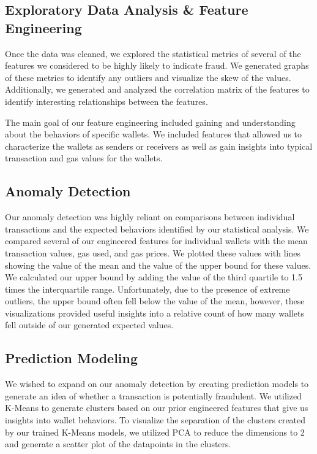 \documentclass[sigconf]{acmart}
\begin{document}
\subsection{Exploratory Data Analysis \& Feature Engineering}

Once the data was cleaned, we explored the statistical metrics of several of the features we considered to be highly likely to indicate fraud. We generated graphs of these metrics to identify any outliers and visualize the skew of the values. Additionally, we generated and analyzed the correlation matrix of the features to identify interesting relationships between the features.  

The main goal of our feature engineering included gaining and understanding about the behaviors of specific wallets. We included features that allowed us to characterize the wallets as senders or receivers as well as gain insights into typical transaction and gas values for the wallets. 

\subsection{Anomaly Detection}
Our anomaly detection was highly reliant on comparisons between individual transactions and the expected behaviors identified by our statistical analysis. We compared several of our engineered features for individual wallets with the mean transaction values, gas used, and gas prices. We plotted these values with lines showing the value of the mean and the value of the upper bound for these values. We calculated our upper bound by adding the value of the third quartile to 1.5 times the interquartile range. Unfortunately, due to the presence of extreme outliers, the upper bound often fell below the value of the mean, however, these visualizations provided useful insights into a relative count of how many wallets fell outside of our generated expected values. 

\subsection{Prediction Modeling}
We wished to expand on our anomaly detection by creating prediction models to generate an idea of whether a transaction is potentially fraudulent. We utilized K-Means to generate clusters based on our prior engineered features that give us insights into wallet behaviors. To visualize the separation of the clusters created by our trained K-Means models, we utilized PCA to reduce the dimensions to 2 and generate a scatter plot of the datapoints in the clusters.  
\end{document}
